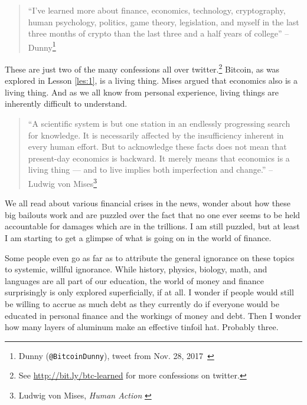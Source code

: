 \begin{samepage}\begin{quotation}
\enquote{I've learned more about finance, economics, technology, cryptography, human
psychology, politics, game theory, legislation, and myself in the last three
months of crypto than the last three and a half years of college}
\flushright -- Dunny\footnote{Dunny (\texttt{@BitcoinDunny}), tweet from Nov. 28,
2017~\cite{bitcoindunny-tweet}}
\end{quotation}\end{samepage}

These are just two of the many confessions all over twitter.\footnote{See
\url{http://bit.ly/btc-learned} for more confessions on twitter.} Bitcoin, as
was explored in Lesson \ref{les:1}, is a living thing. Mises argued that
economics also is a living thing. And as we all know from personal experience,
living things are inherently difficult to understand.

\begin{samepage}\begin{quotation}
\enquote{A scientific system is but one station in an endlessly progressing
search for knowledge. It is necessarily affected by the insufficiency
inherent in every human effort. But to acknowledge these facts does
not mean that present-day economics is backward. It merely means that
economics is a living thing --- and to live implies both imperfection
and change.}
\flushright -- Ludwig von Mises\footnote{Ludwig von Mises, \textit{Human Action}
\cite{human-action}}
\end{quotation}\end{samepage}

\newpage

We all read about various financial crises in the news, wonder about how
these big bailouts work and are puzzled over the fact that no one ever
seems to be held accountable for damages which are in the trillions. I
am still puzzled, but at least I am starting to get a glimpse of what is
going on in the world of finance.

Some people even go as far as to attribute the general ignorance on
these topics to systemic, willful ignorance. While history, physics,
biology, math, and languages are all part of our education, the world of
money and finance surprisingly is only explored superficially, if at
all. I wonder if people would still be willing to accrue as much debt as
they currently do if everyone would be educated in personal finance and
the workings of money and debt. Then I wonder how many layers of
aluminum make an effective tinfoil hat. Probably three.

